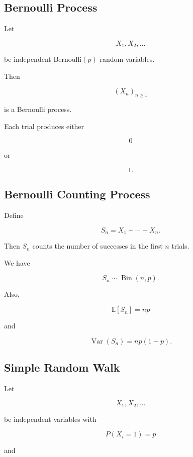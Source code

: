\subsection{Bernoulli Process}
\label{subsec:bernoulli-process}

Let

\[
X_1,X_2,\ldots
\]

be independent Bernoulli\((p)\) random variables.

Then

\[
\boxed{
(X_n)_{n\geq1}
}
\]

is a Bernoulli process.

Each trial produces either

\[
0
\]

or

\[
1.
\]

\subsection{Bernoulli Counting Process}
\label{subsec:bernoulli-counting-process}

Define

\[
\boxed{
S_n
=
X_1+\cdots+X_n.
}
\]

Then \(S_n\) counts the number of successes in the first \(n\) trials.

We have

\[
\boxed{
S_n
\sim
\operatorname{Bin}(n,p).
}
\]

Also,

\[
\mathbb{E}[S_n]=np
\]

and

\[
\operatorname{Var}(S_n)=np(1-p).
\]

\subsection{Simple Random Walk}
\label{subsec:simple-random-walk}

Let

\[
X_1,X_2,\ldots
\]

be independent variables with

\[
P(X_i=1)=p
\]

and

